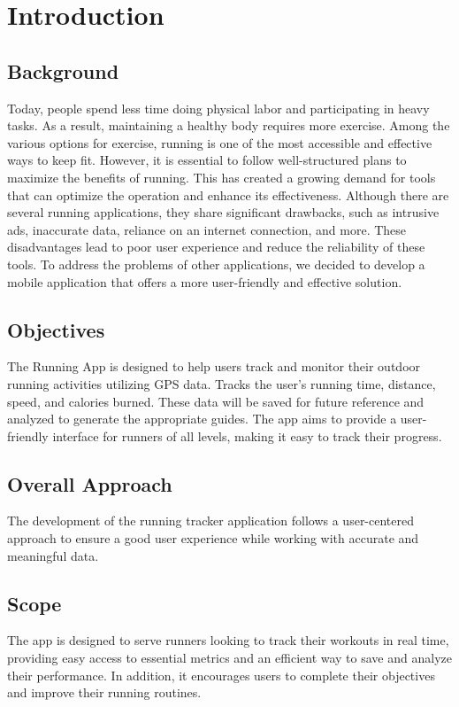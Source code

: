 \section{\bfseries Introduction}
\Large
\subsection{Background}
    Today, people spend less time doing physical labor and participating in heavy tasks. As a result, maintaining a healthy body requires more exercise. Among the various options for exercise, running is one of the most accessible and effective ways to keep fit. 
    However, it is essential to follow well-structured plans to maximize the benefits of running. This has created a growing demand for tools that can optimize the operation and enhance its effectiveness.
    Although there are several running applications, they share significant drawbacks, such as intrusive ads, inaccurate data, reliance on an internet connection, and more. These disadvantages lead to poor user experience and reduce the reliability of these tools.
    To address the problems of other applications, we decided to develop a mobile application that offers a more user-friendly and effective solution.
\subsection{Objectives}
    The Running App is designed to help users track and monitor their outdoor running activities utilizing GPS data. Tracks the user's running time, distance, speed, and calories burned. These data will be saved for future reference and analyzed to generate the appropriate guides. The app aims to provide a user-friendly interface for runners of all levels, making it easy to track their progress.
\subsection{Overall Approach}
    The development of the running tracker application follows a user-centered approach to ensure a good user experience while working with accurate and meaningful data.
\subsection{Scope}
    The app is designed to serve runners looking to track their workouts in real time, providing easy access to essential metrics and an efficient way to save and analyze their performance. In addition, it encourages users to complete their objectives and improve their running routines.
